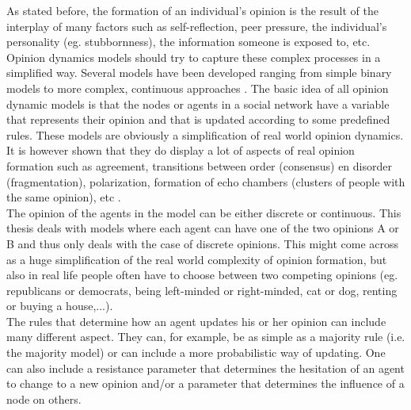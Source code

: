 \documentclass[11 pt , letterpaper , twoside , openright]{book}
\begin{document}
As stated before, the formation of an individual's opinion is the result of the interplay of many factors such as self-reflection, peer pressure, the individual's personality (eg. stubbornness), the information someone is exposed to, etc.  Opinion dynamics models should try to capture these complex processes in a simplified way. Several models have been developed ranging from simple binary models to more complex, continuous approaches \cite{Sirbu2016}. The basic idea of all opinion dynamic models is that the nodes or agents in a social network have a variable that represents their opinion and that is updated according to some predefined rules. These models are obviously a simplification of real world opinion dynamics. It is however shown that they do display a lot of aspects of real opinion formation such as agreement, transitions between order (consensus) en disorder (fragmentation), polarization, formation of echo chambers (clusters of people with the same opinion), etc \cite{Sirbu2016}. \\
The opinion of the agents in the model can be either discrete or continuous. This thesis deals with models where each agent can have one of the two opinions A or B and thus only deals with the case of discrete opinions. This might come across as a huge simplification of the real world complexity of opinion formation, but also in real life people often have to choose between two competing opinions (eg. republicans or democrats, being left-minded or right-minded, cat or dog, renting or buying a house,...). \\
The rules that determine how an agent updates his or her opinion can include many different aspect. They can, for example, be as simple as a majority rule (i.e. the majority model) or can include a more probabilistic way of updating. One can also include a resistance parameter that determines the hesitation of an agent to change to a new opinion and/or a parameter that determines the influence of a node on others.
\end{document}
